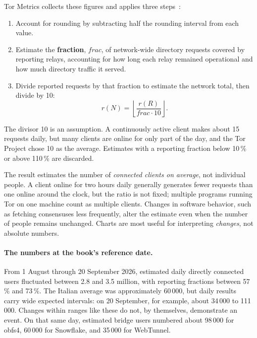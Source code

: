 Tor Metrics collects these figures and applies three steps~\cite{metricsreproducible}:
\begin{enumerate}
  \item Account for rounding by subtracting half the rounding interval from each value.
  \item Estimate the \textbf{fraction}, $\mathit{frac}$, of network-wide directory requests covered by reporting relays, accounting for how long each relay remained operational and how much directory traffic it served.
  \item Divide reported requests by that fraction to estimate the network total, then divide by 10:
\[ r(N) = \left\lfloor \frac{r(R)}{\mathit{frac} \cdot 10} \right\rfloor. \]
\end{enumerate}
The divisor 10 is an assumption. A continuously active client makes about 15 requests daily, but many clients are online for only part of the day, and the Tor Project chose 10 as the average. Estimates with a reporting fraction below 10\,\% or above 110\,\% are discarded.

\begin{attenzione}
The result estimates the number of \emph{connected clients on average}, not individual people. A client online for two hours daily generally generates fewer requests than one online around the clock, but the ratio is not fixed; multiple programs running Tor on one machine count as multiple clients. Changes in software behavior, such as fetching consensuses less frequently, alter the estimate even when the number of people remains unchanged. Charts are most useful for interpreting \emph{changes}, not absolute numbers.
\end{attenzione}

\paragraph{The numbers at the book's reference date.} From 1 August through 20 September 2026, estimated daily directly connected users fluctuated between 2.8 and 3.5 million, with reporting fractions between 57\,\% and 73\,\%. The Italian average was approximately 60\,000, but daily results carry wide expected intervals: on 20 September, for example, about 34\,000 to 111\,000. Changes within ranges like these do not, by themselves, demonstrate an event. On that same day, estimated bridge users numbered about 98\,000 for obfs4, 60\,000 for Snowflake, and 35\,000 for WebTunnel.

